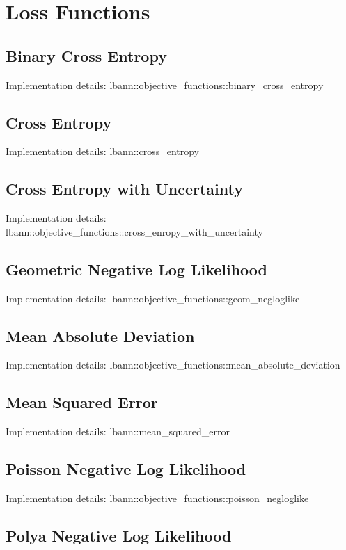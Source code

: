 \hypertarget{obj_fn_loss_functions}{}\section{Loss Functions}\label{obj_fn_loss_functions}
\hypertarget{obj_fn_bin_cross_ent}{}\subsection{Binary Cross Entropy}\label{obj_fn_bin_cross_ent}
Implementation details\+: lbann\+::objective\+\_\+functions\+::binary\+\_\+cross\+\_\+entropy\hypertarget{obj_fn_cross_ent}{}\subsection{Cross Entropy}\label{obj_fn_cross_ent}
Implementation details\+: \hyperlink{classlbann_1_1cross__entropy}{lbann\+::cross\+\_\+entropy}\hypertarget{obj_fn_cross_ent_uncertain}{}\subsection{Cross Entropy with Uncertainty}\label{obj_fn_cross_ent_uncertain}
Implementation details\+: lbann\+::objective\+\_\+functions\+::cross\+\_\+enropy\+\_\+with\+\_\+uncertainty\hypertarget{obj_fn_gemo_negloglike}{}\subsection{Geometric Negative Log Likelihood}\label{obj_fn_gemo_negloglike}
Implementation details\+: lbann\+::objective\+\_\+functions\+::geom\+\_\+negloglike\hypertarget{obj_fn_mad}{}\subsection{Mean Absolute Deviation}\label{obj_fn_mad}
Implementation details\+: lbann\+::objective\+\_\+functions\+::mean\+\_\+absolute\+\_\+deviation\hypertarget{obj_fn_m_s_e}{}\subsection{Mean Squared Error}\label{obj_fn_m_s_e}
Implementation details\+: lbann\+::mean\+\_\+squared\+\_\+error\hypertarget{obj_fn_pos_negloglike}{}\subsection{Poisson Negative Log Likelihood}\label{obj_fn_pos_negloglike}
Implementation details\+: lbann\+::objective\+\_\+functions\+::poisson\+\_\+negloglike\hypertarget{obj_fn_poly_negloglike}{}\subsection{Polya Negative Log Likelihood}\label{obj_fn_poly_negloglike}

